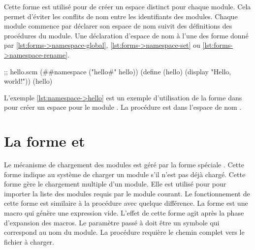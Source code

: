 



Cette forme est utilisé pour de créer un espace distinct pour chaque module.
Cela permet d'éviter les conflits de nom entre les identifiants des modules.
Chaque module commence par déclarer son espace de nom suivit des définitions
des procédures du module. Une déclaration d'espace de nom à l'une des forme
donné par \ref{lst:forms->namespace-global}, \ref{lst:forms->namespace-set}
ou \ref{lst:forms->namespace-rename}.
\\
\begin{center}
\begin{mplisting}{0.6}
;; hello.scm
(##namespace ("hello#" hello))
(define (hello)
  (display "Hello, world!\n"))
(hello)
\end{mplisting}
\end{center}
L'exemple \ref{lst:namespace->hello} est un exemple d'utilisation de la forme
 dans pour créer un espace pour le module .
La procédure  est dans l'espace de nom .

\section{La forme  et }

Le mécanisme de chargement des modules est géré par la forme spéciale
. Cette forme indique au système de charger un module
s'il n'est pas déjà chargé. Cette forme gère le chargement multiple d'un
module. Elle est utilisé pour pour importer la liste des modules requis par le
module courant.  Le fonctionnement de cette forme est similaire à la procédure
 avec quelque différence. La forme  est
une macro qui génère une expression vide. L'effet de cette forme agit après la
phase d'expansion des macros. Le paramètre passé à 
doit être un symbole qui correspond au nom du module. La procédure 
requière le chemin complet vers le fichier à charger.



